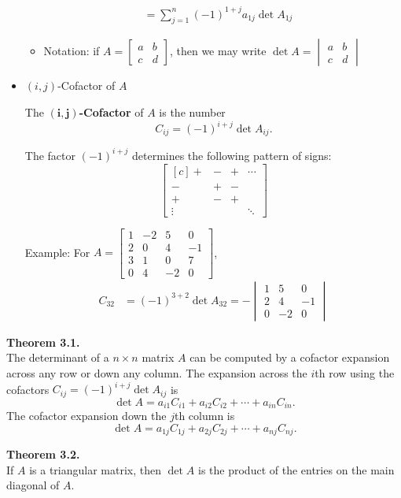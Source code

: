 \documentclass[10pt]{book}
\newenvironment{boxthm}{\begin{mdframed}[backgroundcolor=gray!30,nobreak=true]}{\end{mdframed}}
\newenvironment{boxdef}{\begin{mdframed}[backgroundcolor=gray!30,linewidth=0pt,nobreak=true]}{\end{mdframed}}
\begin{document}
\begin{itemize}
\begin{boxdef}
\begin{align*}
		&= \sum_{j=1}^n(-1)^{1+j}a_{1j}\det A_{1j}
		\end{align*}
	\end{boxdef}
		\begin{itemize}
			\item Notation: if $A=\begin{bmatrix}a&b\\c&d\end{bmatrix}$, then we may write $\det A = \begin{vmatrix}a&b\\c&d\end{vmatrix}$
		\end{itemize}
	\item $(i,j)$-Cofactor of $A$
	\begin{boxdef}
		\begin{multicols}{2}
			The \textbf{$\boldsymbol{(i,j)}$-Cofactor} of $A$ is the number
			$$ C_{ij} = (-1)^{i+j}\det A_{ij}. $$
			
			The factor $(-1)^{i+j}$ determines the following pattern of signs:
			$$\begin{bmatrix}[c] +&-&+&\cdots \\ -&+&-& \\ +&-&+& \\ \vdots&&&\ddots \end{bmatrix}$$
			
			\columnbreak
			
			Example: For $A=\begin{bmatrix} 1&-2&5&0 \\ 2&0&4&-1 \\ 3&1&0&7 \\ 0&4&-2&0 \end{bmatrix}$,
			\begin{align*}
			C_{32} &= (-1)^{3+2}\det A_{32} =
			-\begin{vmatrix}1&5&0\\2&4&-1\\0&-2&0\end{vmatrix}
			\end{align*}
		\end{multicols}
	\end{boxdef}
\end{itemize}

\begin{boxthm}
	\textbf{Theorem 3.1.} \\
	The determinant of a $n\times n$ matrix $A$ can be computed by a cofactor expansion across any row or down any column. The expansion across the $i$th row using the cofactors $C_{ij} = (-1)^{i+j}\det A_{ij}$ is
	$$ \det A = a_{i1}C_{i1} + a_{i2}C_{i2} + \cdots + a_{in}C_{in}. $$
	The cofactor expansion down the $j$th column is
	$$ \det A = a_{1j}C_{1j} + a_{2j}C_{2j} + \cdots + a_{nj}C_{nj}. $$
\end{boxthm}
\begin{boxthm}
	\textbf{Theorem 3.2.} \\
	If $A$ is a triangular matrix, then $\det A$ is the product of the entries on the main diagonal of $A$.
\end{boxthm}
\end{document}
